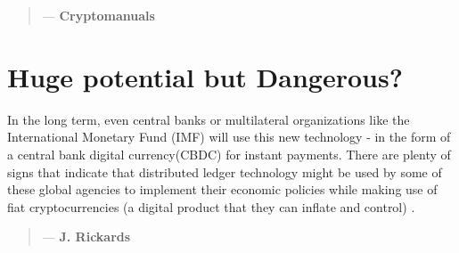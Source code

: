 \begin{quotation}

  \textit{}
  \begin{flushright}
    \small{--- \textbf{Cryptomanuals}}
  \end{flushright}

\end{quotation}

\section{Huge potential but Dangerous?}
In the long term, even central banks or multilateral organizations like the International Monetary Fund (IMF) will use this new technology - in the form of a central bank digital currency(CBDC) for instant payments. There are plenty of signs that indicate that distributed ledger technology might be used by some of these global agencies to implement their economic policies while making use of fiat cryptocurrencies (a digital product that they can inflate and control) \parencite{IMF_F&D}.


\begin{quotation}

      \textit{}
      \begin{flushright}
        \small{--- \textbf{J. Rickards}}
      \end{flushright}
    
\end{quotation}

